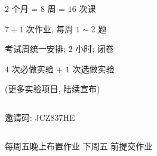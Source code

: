 
\begin{frame}{}
  \begin{center}
    {\large $2$ 个月 = $8$ 周 = $16$ 次课}
  \end{center}

\end{frame}

\begin{frame}{}
  \begin{center}
     $7 + 1$ 次作业, 每周 $1 \sim 2$ 题
    \vspace{1.00cm}

     考试周统一安排; $2$ 小时; 闭卷

    \vspace{1.00cm}
     $4$ 次必做实验 + $1$ 次选做实验 

    \vspace{0.50cm}
    (更多实验项目, 陆续宣布)
  \end{center}
\end{frame}

\begin{frame}{}
  \begin{columns}
      \begin{center}
        邀请码: JCZ837HE
      \end{center}
  \end{columns}

  \vspace{1.0cm}
  \begin{center}
    每周五晚上布置作业 \qquad 下周五  前提交作业
  \end{center}
\end{frame}




